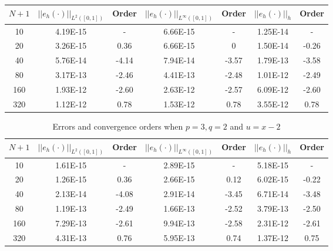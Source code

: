 \documentclass[11pt]{article}      %
\begin{document}
\begin{enumerate}
\begin{enumerate}
\begin{table}[!h]
\begin{tabular}{|c|c|c| c| c| c| c|}
	$N+1$&  $||e_h(\cdot)||_{L^2([0,1])}$ & Order  & $||e_h(\cdot)||_{L^\infty([0,1])}$ & Order& $||e_h(\cdot)||_h$& Order \\
	\hline
	10 & 4.19E-15 & - & 6.66E-15 & - & 1.25E-14 &- \\
	20 & 3.26E-15 & 0.36&6.66E-15   & 0   & 1.50E-14 &-0.26\\
	40 & 5.76E-14  & -4.14 & 7.94E-14   & -3.57 & 1.79E-13 &-3.58\\
	80 & 3.17E-13  & -2.46 & 4.41E-13   & -2.48 & 1.01E-12 &-2.49\\
	160 & 1.93E-12   & -2.60 & 2.63E-12   &-2.57  & 6.09E-12 &-2.60\\
	320 &1.12E-12  & 0.78  & 1.53E-12   & 0.78 & 3.55E-12 &0.78\\
	\hline
\end{tabular}
\label{tab3}
\end{table}

\begin{table}[!h]
	\caption{Errors and convergence orders when $p=3, q=2$ and $u=x-2$}
	\vspace{0.1in}
	\centering
	\begin{tabular}{|c|c|c| c| c| c| c|}
		\hline
		$N+1$&  $||e_h(\cdot)||_{L^2([0,1])}$ & Order  & $||e_h(\cdot)||_{L^\infty([0,1])}$ & Order& $||e_h(\cdot)||_h$& Order \\
		\hline
		10  & 1.61E-15 & -    & 2.89E-15 & -    & 5.18E-15 & - \\
		20  & 1.26E-15 & 0.36 & 2.66E-15 & 0.12 & 6.02E-15 & -0.22 \\
		40  & 2.13E-14 & -4.08& 2.91E-14 & -3.45& 6.71E-14 & -3.48 \\
		80  & 1.19E-13 & -2.49& 1.66E-13 & -2.52& 3.79E-13 & -2.50 \\
		160 & 7.29E-13 & -2.61& 9.94E-13 & -2.58& 2.31E-12 & -2.61 \\
		320 & 4.31E-13 & 0.76 & 5.95E-13 & 0.74 & 1.37E-12 & 0.75 \\
		\hline
	\end{tabular}
	\label{tab4}
\end{table}


\end{enumerate}
\end{enumerate}
\end{document}
